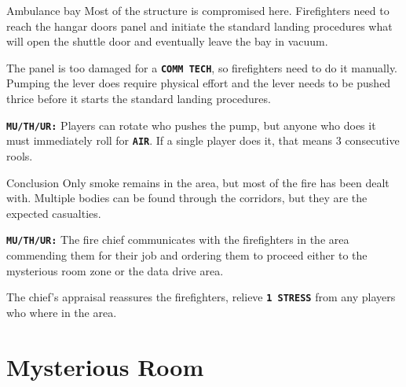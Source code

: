 \newsect


\begin{rpg-commentbox}{Ambulance bay}
    Most of the structure is compromised here. Firefighters need to reach the hangar doors panel and initiate the standard landing procedures what will open the shuttle door and eventually leave the bay in vacuum. 

    The panel is too damaged for a \texttt{\textbf{COMM TECH}}, so firefighters need to do it manually. Pumping the lever does require  physical effort and the lever needs to be pushed thrice before it starts the standard landing procedures. 

    \texttt{\textbf{MU/TH/UR:}} Players can rotate who pushes the pump, but anyone who does it must immediately roll for \texttt{\textbf{AIR}}. If a single player does it, that means 3 consecutive rools.
\end{rpg-commentbox}  

\newsect


\begin{rpg-commentbox}{Conclusion}
    Only smoke remains in the area, but most of the fire has been dealt with. Multiple bodies can be found through the corridors, but they are the expected casualties.
    
    \texttt{\textbf{MU/TH/UR:}} The fire chief communicates with the firefighters in the area commending them for their job  and ordering them to proceed either to the mysterious room zone or the data drive area. 

    The chief's appraisal reassures the firefighters, relieve \texttt{\textbf{1 STRESS}} from any players who where in the area.
\end{rpg-commentbox}  



\clearpage

\section{Mysterious Room}

